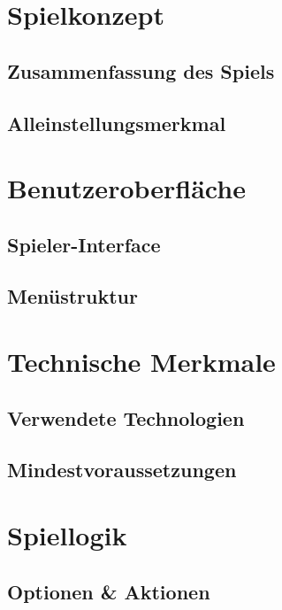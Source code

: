 \documentclass[12pt]{article}
\begin{document}
\tableofcontents
\newpage

\section{Spielkonzept}

\subsection{Zusammenfassung des Spiels}

\subsection{Alleinstellungsmerkmal}


\section{Benutzeroberfläche}

\subsection{Spieler-Interface}

\subsection{Menüstruktur}


\section{Technische Merkmale}

\subsection{Verwendete Technologien}

\subsection{Mindestvoraussetzungen}


\section{Spiellogik}

\subsection{Optionen \& Aktionen}
\end{document}
